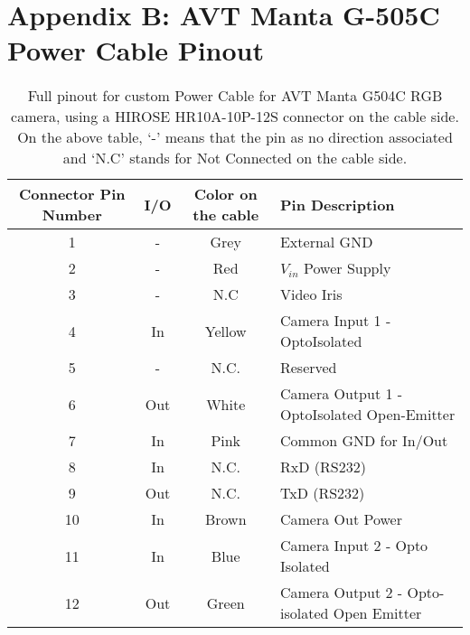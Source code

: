 \section{Appendix B: AVT Manta G-505C Power Cable Pinout}
\label{sec:appendix-b}

\begin{table}[H]
	\renewcommand{\arraystretch}{1.2}
	\centering
	\begin{tabular}{@{}cccl@{}}
		\toprule
		Connector Pin Number & I/O & Color on the cable & Pin Description \\ \midrule
		1  & -   & Grey   & External GND \\
		2  & -   & Red    & $V_{in}$ Power Supply \\
		3  & -   & N.C    & Video Iris \\
		4  & In  & Yellow & Camera Input 1 - OptoIsolated  \\
		5  & -   & N.C.   & Reserved \\
		6  & Out & White  & Camera Output 1 - OptoIsolated Open-Emitter \\
		7  & In  & Pink   & Common GND for In/Out \\
		8  & In  & N.C.   & RxD (RS232) \\
		9  & Out & N.C.   & TxD (RS232) \\
		10 & In  & Brown  & Camera Out Power \\
		11 & In  & Blue   & Camera Input 2 - Opto Isolated \\
		12 & Out & Green  & Camera Output 2 - Opto-isolated Open Emitter \\ 
		\bottomrule 
	\end{tabular} \caption{Full pinout for custom Power Cable for AVT Manta G504C RGB camera, using a HIROSE HR10A-10P-12S connector on the cable side. On the above table, `-' means that the pin as no direction associated and `N.C' stands for Not Connected on the cable side.}
	\label{tab:manta-power-cable-pinout} 
\end{table}


